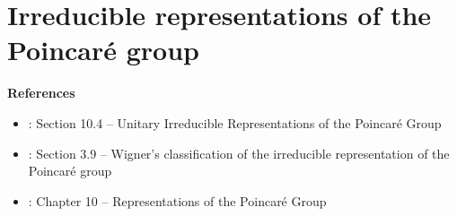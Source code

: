 

\chapter{Irreducible representations of the Poincaré group}
\setcounter{theorem}{0}
\setcounter{equation}{0}


\renewcommand{\theenumi}{\roman{enumi}}
\renewcommand{\labelenumi}{\textnormal{(\theenumi)}$\;\;$}


\noindent
\textbf{References}
\begin{itemize}
\item
	\cite{Tung1985}: Section 10.4 -- Unitary Irreducible Representations of the Poincaré Group
\item
	\cite{Sternberg1994}: Section 3.9 -- Wigner's classification of the irreducible representation of the Poincaré group
\item
	\cite{Jones2020}: Chapter 10 -- Representations of the Poincaré Group
\end{itemize}

